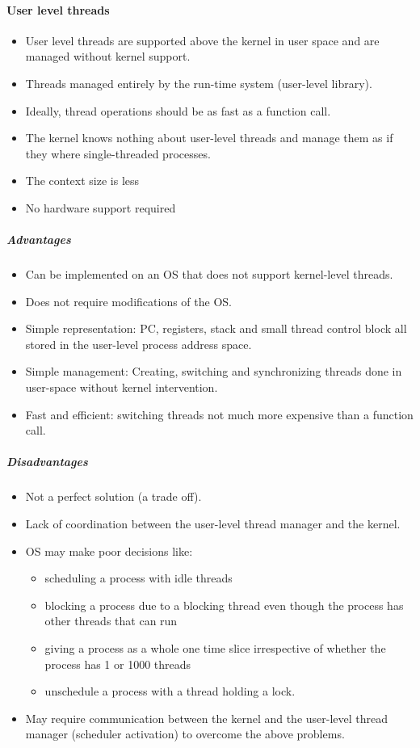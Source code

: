 \paragraph{User level threads}
\begin{itemize}
	\item User level threads are supported above the kernel in user space and are managed without kernel support.
	\item Threads managed entirely by the run-time system (user-level library).
	\item Ideally, thread operations should be as fast as a function call.
	\item The kernel knows nothing about user-level threads and manage them as if they where single-threaded processes.
	\item The context size is less
	\item No hardware support required
\end{itemize}

\subparagraph{Advantages}
\begin{itemize}
	\item Can be implemented on an OS that does not support kernel-level threads.
	\item Does not require modifications of the OS.
	\item Simple representation: PC, registers, stack and small thread control block all stored in the user-level process address space.
	\item Simple management: Creating, switching and synchronizing threads done in user-space without kernel intervention.
	\item Fast and efficient: switching threads not much more expensive than a function call.
\end{itemize}
\subparagraph{Disadvantages}
\begin{itemize}
	\item Not a perfect solution (a trade off).
	\item Lack of coordination between the user-level thread manager and the kernel.
	\item OS may make poor decisions like:
	\begin{itemize}
		\item scheduling a process with idle threads
		\item blocking a process due to a blocking thread even though the process has other threads that can run
		\item giving a process as a whole one time slice irrespective of whether the process has 1 or 1000 threads
		\item unschedule a process with a thread holding a lock.
	\end{itemize}
	\item May require communication between the kernel and the user-level thread manager (scheduler activation) to overcome the above problems.
\end{itemize}
